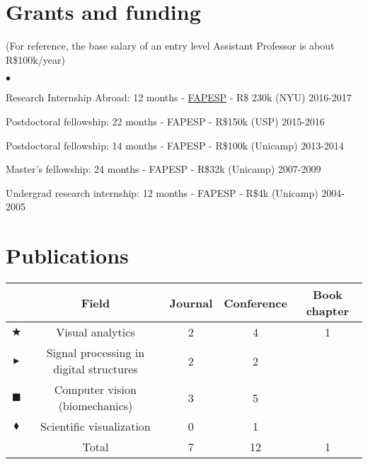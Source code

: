 \documentclass[12pt]{article}
\newcommand{\squishlist}{
 \begin{list}{$\bullet$}
  { \setlength{\itemsep}{0pt}
     \setlength{\parsep}{3pt}
     \setlength{\topsep}{3pt}
     \setlength{\partopsep}{0pt}
     \setlength{\leftmargin}{1.5em}
     \setlength{\labelwidth}{1em}
     \setlength{\labelsep}{0.5em} } }%
\newcommand{\squishend}{
  \end{list}  }%
\newcommand{\va}{\ensuremath{\bigstar}}
\newcommand{\gsp}{\ensuremath{\blacktriangleright}}
\newcommand{\cv}{\ensuremath{\blacksquare}}
\newcommand{\scivis}{\ensuremath{\blacklozenge}}
\newcommand{\mySec}[1]{\vspace{-0.5em}\section*{#1}\vspace{-0.5em}}
\begin{document}
\mySec{Grants and funding}
{\small (For reference, the base salary of an entry level Assistant Professor is about R\$100k/year)}
\squishlist
  \item{Research Internship Abroad: 12 months - \href{http://www.fapesp.br/en/about}{FAPESP} - R\$ 230k (NYU) \hfill 2016-2017}
  \item{Postdoctoral fellowship: 22 months - FAPESP - R\$150k (USP) \hfill 2015-2016}
  \item{Postdoctoral fellowship: 14 months - FAPESP - R\$100k  (Unicamp) \hfill 2013-2014}
  \item{Master's fellowship: 24 months - FAPESP - R\$32k  (Unicamp) \hfill 2007-2009}
  \item{Undergrad research internship: 12 months - FAPESP - R\$4k  (Unicamp) \hfill 2004-2005}
\squishend


\mySec{Publications} 
\begin{center}
  \begin{tabular}{ |c|c|c|c|c| } 
   \hline
               &    Field                       & Journal & Conference & Book chapter \\\hline
    \va&Visual analytics                        &    2    &      4     &      1       \\
    \gsp&Signal processing in digital structures &    2    &      2     &  \\
    \cv&Computer vision (biomechanics)          &    3    &      5     &  \\
    \scivis&Scientific visualization                &    0    &      1     &  \\\hline
    &Total                                   &    7    &     12     &     1 \\
   \hline
  \end{tabular}
\end{center}
\end{document}
